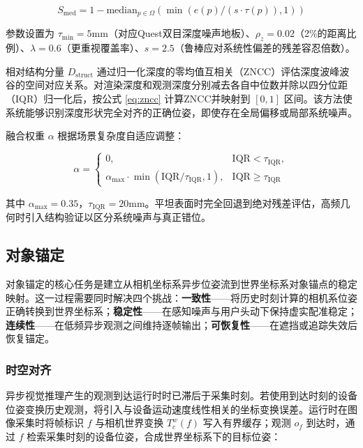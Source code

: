 \documentclass[review]{vgtc}
\begin{document}
\begin{equation}
S_{\mathrm{med}} = 1 - \mathrm{median}_{p \in \Omega} (\min\!\left(e(p)/(s \cdot \tau(p)), 1\right))
\label{eq:depth-stats}
\end{equation}


参数设置为 $\tau_{\mathrm{min}} = 5 \mathrm{mm}$（对应Quest双目深度噪声地板）、$\rho_z = 0.02$（2\%的距离比例）、$\lambda = 0.6$（更重视覆盖率）、$s = 2.5$（鲁棒应对系统性偏差的残差容忍倍数）。

相对结构分量 $D_{\mathrm{struct}}$ 通过归一化深度的零均值互相关（ZNCC）评估深度波峰波谷的空间对应关系。对渲染深度和观测深度分别减去各自中位数并除以四分位距（IQR）归一化后，按公式 \ref{eq:zncc} 计算ZNCC并映射到 $[0,1]$ 区间。该方法使系统能够识别深度形状完全对齐的正确位姿，即使存在全局偏移或局部系统噪声。

融合权重 $\alpha$ 根据场景复杂度自适应调整：

\begin{equation}
\alpha = \begin{cases}
0, & \mathrm{IQR} < \tau_{\mathrm{IQR}}, \\
\alpha_{\mathrm{max}} \cdot \min\!\left(\mathrm{IQR}/\tau_{\mathrm{IQR}}, 1\right), & \mathrm{IQR} \geq \tau_{\mathrm{IQR}}
\end{cases}
\label{eq:depth-alpha}
\end{equation}


其中 $\alpha_{\mathrm{max}} = 0.35$，$\tau_{\mathrm{IQR}} = 20 \mathrm{mm}$。平坦表面时完全回退到绝对残差评估，高频几何时引入结构验证以区分系统噪声与真正错位。

\subsection{对象锚定}\label{sec:anchoring}


对象锚定的核心任务是建立从相机坐标系异步位姿流到世界坐标系对象锚点的稳定映射。这一过程需要同时解决四个挑战：\textbf{一致性}------将历史时刻计算的相机系位姿正确转换到世界坐标系；\textbf{稳定性}------在感知噪声与用户头动下保持虚实配准稳定；\textbf{连续性}------在低频异步观测之间维持逐帧输出；\textbf{可恢复性}------在遮挡或追踪失效后恢复锚定。

\subsubsection{时空对齐}\label{sec:alignment}


异步视觉推理产生的观测到达运行时时已滞后于采集时刻。若使用到达时刻的设备位姿变换历史观测，将引入与设备运动速度线性相关的坐标变换误差。运行时在图像采集时将帧标识 $f$ 与相机世界变换 $T_c^w(f)$ 写入有界缓存；观测 $o_f$ 到达时，通过 $f$ 检索采集时刻的设备位姿，合成世界坐标系下的目标位姿：
\end{document}
